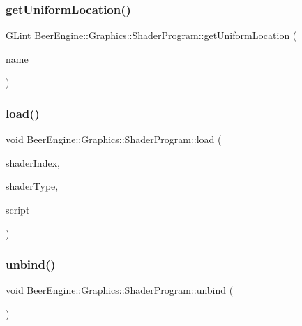 \subsubsection{\texorpdfstring{get\+Uniform\+Location()}{getUniformLocation()}}
{\footnotesize\ttfamily G\+Lint Beer\+Engine\+::\+Graphics\+::\+Shader\+Program\+::get\+Uniform\+Location (\begin{DoxyParamCaption}\item[{std\+::string const \&}]{name }\end{DoxyParamCaption})}

\mbox{\label{class_beer_engine_1_1_graphics_1_1_shader_program_ac205d24d3c80e87fed7010acbcb40b33}} 
\subsubsection{\texorpdfstring{load()}{load()}}
{\footnotesize\ttfamily void Beer\+Engine\+::\+Graphics\+::\+Shader\+Program\+::load (\begin{DoxyParamCaption}\item[{unsigned int}]{shader\+Index,  }\item[{G\+Lenum}]{shader\+Type,  }\item[{const char $\ast$}]{script }\end{DoxyParamCaption})}

\mbox{\label{class_beer_engine_1_1_graphics_1_1_shader_program_a280b1136661844c2af0bde2ad09f6200}} 
\subsubsection{\texorpdfstring{unbind()}{unbind()}}
{\footnotesize\ttfamily void Beer\+Engine\+::\+Graphics\+::\+Shader\+Program\+::unbind (\begin{DoxyParamCaption}\item[{void}]{ }\end{DoxyParamCaption})}

